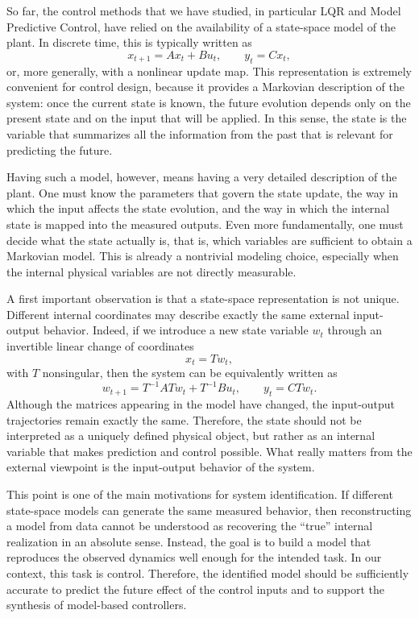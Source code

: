 So far, the control methods that we have studied, in particular LQR and Model Predictive Control, have relied on the availability of a state-space model of the plant. In discrete time, this is typically written as
\[
x_{t+1} = A x_t + B u_t, 
\qquad
y_t = C x_t,
\]
or, more generally, with a nonlinear update map. This representation is extremely convenient for control design, because it provides a Markovian description of the system: once the current state is known, the future evolution depends only on the present state and on the input that will be applied. In this sense, the state is the variable that summarizes all the information from the past that is relevant for predicting the future.

Having such a model, however, means having a very detailed description of the plant. One must know the parameters that govern the state update, the way in which the input affects the state evolution, and the way in which the internal state is mapped into the measured outputs. Even more fundamentally, one must decide what the state actually is, that is, which variables are sufficient to obtain a Markovian model. This is already a nontrivial modeling choice, especially when the internal physical variables are not directly measurable.

A first important observation is that a state-space representation is not unique. Different internal coordinates may describe exactly the same external input-output behavior. Indeed, if we introduce a new state variable \(w_t\) through an invertible linear change of coordinates
\[
x_t = T w_t,
\]
with \(T\) nonsingular, then the system can be equivalently written as
\[
w_{t+1} = T^{-1} A T w_t + T^{-1} B u_t,
\qquad
y_t = C T w_t.
\]
Although the matrices appearing in the model have changed, the input-output trajectories remain exactly the same. Therefore, the state should not be interpreted as a uniquely defined physical object, but rather as an internal variable that makes prediction and control possible. What really matters from the external viewpoint is the input-output behavior of the system.

This point is one of the main motivations for system identification. If different state-space models can generate the same measured behavior, then reconstructing a model from data cannot be understood as recovering the ``true'' internal realization in an absolute sense. Instead, the goal is to build a model that reproduces the observed dynamics well enough for the intended task. In our context, this task is control. Therefore, the identified model should be sufficiently accurate to predict the future effect of the control inputs and to support the synthesis of model-based controllers.

